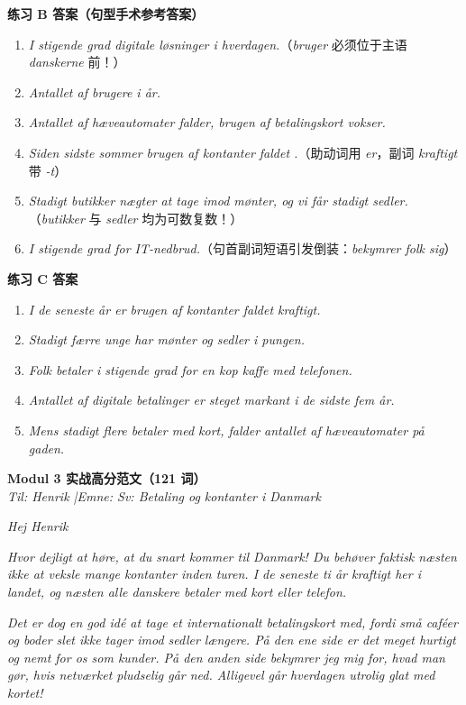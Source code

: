 \begin{answerbox}
\textbf{练习 B 答案（句型手术参考答案）}
\begin{enumerate}
  \item \textit{I stigende grad  digitale løsninger i hverdagen.}（\textit{bruger} 必须位于主语 \textit{danskerne} 前！）
  \item \textit{Antallet af brugere  i år.}
  \item \textit{Antallet af hæveautomater falder,  brugen af betalingskort vokser.}
  \item \textit{Siden sidste sommer  brugen af kontanter faldet .}（助动词用 \textit{er}，副词 \textit{kraftigt} 带 \textit{-t}）
  \item \textit{Stadigt  butikker nægter at tage imod mønter, og vi får stadigt  sedler.}（\textit{butikker} 与 \textit{sedler} 均为可数复数！）
  \item \textit{I stigende grad  for IT-nedbrud.}（句首副词短语引发倒装：\textit{bekymrer folk sig}）
\end{enumerate}

\textbf{练习 C 答案}
\begin{enumerate}
  \item \textit{I de seneste år er brugen af kontanter faldet kraftigt.}
  \item \textit{Stadigt færre unge har mønter og sedler i pungen.}
  \item \textit{Folk betaler i stigende grad for en kop kaffe med telefonen.}
  \item \textit{Antallet af digitale betalinger er steget markant i de sidste fem år.}
  \item \textit{Mens stadigt flere betaler med kort, falder antallet af hæveautomater på gaden.}
\end{enumerate}

\textbf{Modul 3 实战高分范文（121 词）}\\
\textit{Til: Henrik \quad|\quad Emne: Sv: Betaling og kontanter i Danmark}

\textit{Hej Henrik}

\textit{Hvor dejligt at høre, at du snart kommer til Danmark! Du behøver faktisk næsten ikke at veksle mange kontanter inden turen. I de seneste ti år  kraftigt her i landet, og næsten alle danskere betaler med kort eller telefon.}

\textit{Det er dog en god idé at tage et internationalt betalingskort med, fordi  små caféer og boder slet ikke tager imod sedler længere. På den ene side er det meget hurtigt og nemt for os som kunder. På den anden side bekymrer jeg mig  for, hvad man gør, hvis netværket pludselig går ned. Alligevel går hverdagen utrolig glat med kortet!}


\end{answerbox}
